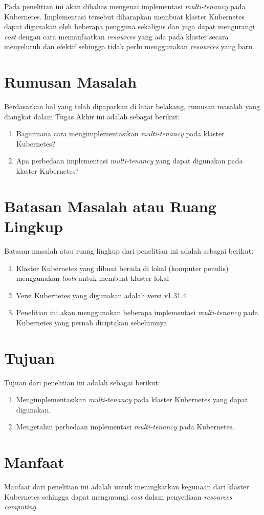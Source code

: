 Pada penelitian ini akan dibahas mengenai implementasi \emph{multi-tenancy}
pada Kubernetes. Implementasi tersebut diharapkan membuat klaster
Kubernetes dapat digunakan oleh beberapa pengguna sekaligus dan juga dapat
mengurangi \emph{cost} dengan cara memanfaatkan \emph{resources} yang ada
pada klaster secara menyeluruh dan efektif sehingga tidak perlu menggunakan
\emph{resources} yang baru.

\section{Rumusan Masalah}

Berdasarkan hal yang telah dipaparkan di latar belakang, rumusan masalah
yang diangkat dalam Tugas Akhir ini adalah sebagai berikut:
\begin{enumerate}[itemsep=-0.2cm, topsep=-0.3cm]
  \item{Bagaimana cara mengimplementasikan \emph{multi-tenancy} pada klaster Kubernetes?}
  \item{Apa perbedaan implementasi \emph{multi-tenancy} yang dapat digunakan pada klaster Kubernetes?}
\end{enumerate}

\section{Batasan Masalah atau Ruang Lingkup}

Batasan masalah atau ruang lingkup dari penelitian ini adalah sebagai berikut:
\begin{enumerate}[itemsep=-0.2cm, topsep=-0.3cm]
  \item{Klaster Kubernetes yang dibuat berada di lokal (komputer penulis) menggunakan \emph{tools} untuk membuat klaster lokal}
  \item{Versi Kubernetes yang digunakan adalah versi v1.31.4}
  \item{Penelitian ini akan menggunakan beberapa implementasi \emph{multi-tenancy} pada Kubernetes yang pernah diciptakan sebelumnya}
\end{enumerate}

\section{Tujuan}

Tujuan dari penelitian ini adalah sebagai berikut:
\begin{enumerate}[itemsep=-0.2cm, topsep=-0.3cm]
  \item{Mengimplementasikan \emph{multi-tenancy} pada klaster Kubernetes yang dapat digunakan.}
  \item{Mengetahui perbedaan implementasi \emph{multi-tenancy} pada Kubernetes.}
\end{enumerate}

\section{Manfaat}

Manfaat dari penelitian ini adalah untuk meningkatkan kegunaan dari
klaster Kubernetes sehingga dapat mengurangi \emph{cost} dalam penyediaan
\emph{resources computing}.
